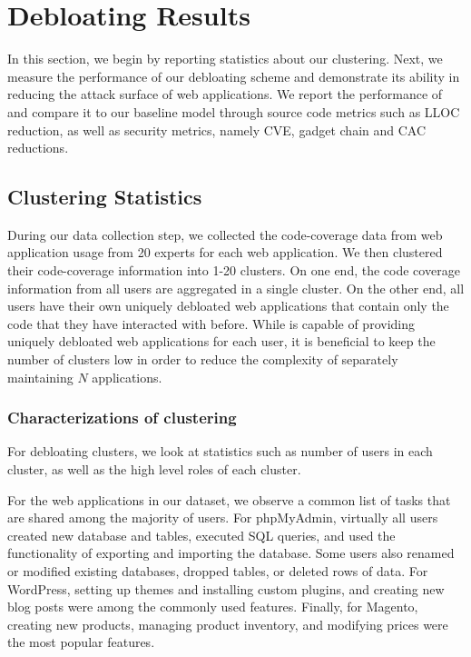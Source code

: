 \section{Debloating Results}
\label{sec:debloatingresults}

In this section, we begin by reporting statistics about our clustering. 
Next, we measure the performance of our debloating scheme and demonstrate its ability in reducing the attack surface of web applications. 
We report the performance of \dbltr{} and compare it to our baseline model through source code metrics such as LLOC reduction, as well as security metrics, namely CVE, gadget chain and CAC reductions. 

\subsection{Clustering Statistics}
During our data collection step, we collected the code-coverage data from web application usage from 20 experts for each web application.
We then clustered their code-coverage information into 1-20 clusters. 
On one end, the code coverage information from all users are aggregated in a single cluster. 
On the other end, all users have their own uniquely debloated web applications that contain only the code that they have interacted with before. 
While \dbltr{} is capable of providing uniquely debloated web applications for each user, it is beneficial to keep the number of clusters low in order to reduce the complexity of separately maintaining $N$ applications. 

\subsubsection{Characterizations of \dbltr{} clustering}
For \dbltr{} debloating clusters, we look at statistics such as number of users in each cluster, as well as the high level roles of each cluster. 

For the web applications in our dataset, we observe a common list of tasks that are shared among the majority of users. 
For phpMyAdmin, virtually all users created new database and tables, executed SQL queries, and used the functionality of exporting and importing the database.
Some users also renamed or modified existing databases, dropped tables, or deleted rows of data. 
For WordPress, setting up themes and installing custom plugins, and creating new blog posts were among the commonly used features. 
Finally, for Magento, creating new products, managing product inventory, and modifying prices were the most popular features. 

